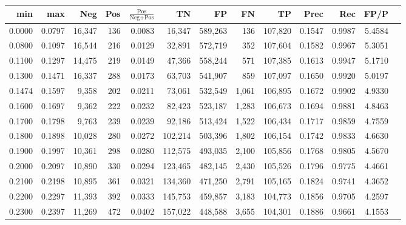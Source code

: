 \begin{tabular}{rrrrrrrrrrrrr}
\toprule
   min &    max &    Neg &   Pos & $\frac{\text{Pos}}{\text{Neg}+\text{Pos}}$ &      TN &      FP &      FN &      TP &   Prec &    Rec &   FP/P \\
\midrule
0.0000 & 0.0797 & 16,347 &   136 &                                     0.0083 &  16,347 & 589,263 &     136 & 107,820 & 0.1547 & 0.9987 & 5.4584 \\
0.0800 & 0.1097 & 16,544 &   216 &                                     0.0129 &  32,891 & 572,719 &     352 & 107,604 & 0.1582 & 0.9967 & 5.3051 \\
0.1100 & 0.1297 & 14,475 &   219 &                                     0.0149 &  47,366 & 558,244 &     571 & 107,385 & 0.1613 & 0.9947 & 5.1710 \\
0.1300 & 0.1471 & 16,337 &   288 &                                     0.0173 &  63,703 & 541,907 &     859 & 107,097 & 0.1650 & 0.9920 & 5.0197 \\
0.1474 & 0.1597 &  9,358 &   202 &                                     0.0211 &  73,061 & 532,549 &   1,061 & 106,895 & 0.1672 & 0.9902 & 4.9330 \\
0.1600 & 0.1697 &  9,362 &   222 &                                     0.0232 &  82,423 & 523,187 &   1,283 & 106,673 & 0.1694 & 0.9881 & 4.8463 \\
0.1700 & 0.1798 &  9,763 &   239 &                                     0.0239 &  92,186 & 513,424 &   1,522 & 106,434 & 0.1717 & 0.9859 & 4.7559 \\
0.1800 & 0.1898 & 10,028 &   280 &                                     0.0272 & 102,214 & 503,396 &   1,802 & 106,154 & 0.1742 & 0.9833 & 4.6630 \\
0.1900 & 0.1997 & 10,361 &   298 &                                     0.0280 & 112,575 & 493,035 &   2,100 & 105,856 & 0.1768 & 0.9805 & 4.5670 \\
0.2000 & 0.2097 & 10,890 &   330 &                                     0.0294 & 123,465 & 482,145 &   2,430 & 105,526 & 0.1796 & 0.9775 & 4.4661 \\
0.2100 & 0.2198 & 10,895 &   361 &                                     0.0321 & 134,360 & 471,250 &   2,791 & 105,165 & 0.1824 & 0.9741 & 4.3652 \\
0.2200 & 0.2297 & 11,393 &   392 &                                     0.0333 & 145,753 & 459,857 &   3,183 & 104,773 & 0.1856 & 0.9705 & 4.2597 \\
0.2300 & 0.2397 & 11,269 &   472 &                                     0.0402 & 157,022 & 448,588 &   3,655 & 104,301 & 0.1886 & 0.9661 & 4.1553 \\

\end{tabular}

